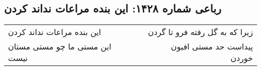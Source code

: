 \begin{center}
\section*{رباعی شماره ۱۴۲۸: این بنده مراعات نداند کردن}
\label{sec:1428}
\begin{longtable}{l p{0.5cm} r}
این بنده مراعات نداند کردن
&&
زیرا که به گل رفته فرو تا گردن
\\
این مستی ما چو مستی مستان نیست
&&
پیداست حد مستی افیون خوردن
\\
\end{longtable}
\end{center}
